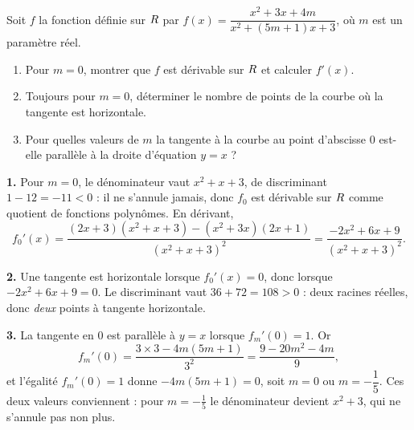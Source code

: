 \begin{concours}
Soit $f$ la fonction définie sur $R$ par $f(x) = \dfrac{x^{2}+3x+4m}{x^{2}+(5m+1)x+3}$,
où $m$ est un paramètre réel.

\begin{enumerate}[label=\textbf{\arabic*.}, leftmargin=*, itemsep=0.25em]
  \item Pour $m = 0$, montrer que $f$ est dérivable sur $R$ et calculer
        $f'(x)$.
  \item Toujours pour $m = 0$, déterminer le nombre de points de la courbe où
        la tangente est horizontale.
  \item Pour quelles valeurs de $m$ la tangente à la courbe au point
        d'abscisse $0$ est-elle parallèle à la droite d'équation $y = x$ ?
\end{enumerate}
\end{concours}

\begin{corrige}
\textbf{1.} Pour $m = 0$, le dénominateur vaut $x^{2}+x+3$, de discriminant
$1-12 = -11 < 0$ : il ne s'annule jamais, donc $f_{0}$ est dérivable sur $R$
comme quotient de fonctions polynômes. En dérivant,
\[
  f_{0}'(x) = \frac{(2x+3)(x^{2}+x+3)-(x^{2}+3x)(2x+1)}{(x^{2}+x+3)^{2}}
            = \frac{-2x^{2}+6x+9}{(x^{2}+x+3)^{2}} .
\]

\textbf{2.} Une tangente est horizontale lorsque $f_{0}'(x) = 0$, donc lorsque
$-2x^{2}+6x+9 = 0$. Le discriminant vaut $36+72 = 108 > 0$ : deux racines
réelles, donc \emph{deux} points à tangente horizontale.

\textbf{3.} La tangente en $0$ est parallèle à $y = x$ lorsque $f_{m}'(0) = 1$.
Or
\[
  f_{m}'(0) = \frac{3 \times 3 - 4m(5m+1)}{3^{2}} = \frac{9-20m^{2}-4m}{9},
\]
et l'égalité $f_{m}'(0) = 1$ donne $-4m(5m+1) = 0$, soit $m = 0$ ou
$m = -\dfrac{1}{5}$. Ces deux valeurs conviennent : pour $m = -\frac15$ le
dénominateur devient $x^{2}+3$, qui ne s'annule pas non plus.
\end{corrige}


